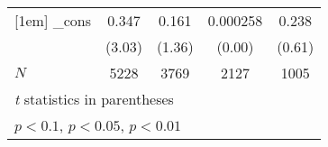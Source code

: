 {\begin{tabular}{l*{4}{c}}
[1em]
\_cons      &       0.347\sym{***}&       0.161         &    0.000258         &       0.238         \\
            &      (3.03)         &      (1.36)         &      (0.00)         &      (0.61)         \\
\hline
\(N\)       &        5228         &        3769         &        2127         &        1005         \\
\hline\hline
\multicolumn{5}{l}{\footnotesize \textit{t} statistics in parentheses}\\
\multicolumn{5}{l}{\footnotesize \sym{*} \(p<0.1\), \sym{**} \(p<0.05\), \sym{***} \(p<0.01\)}\\
\end{tabular}
}
